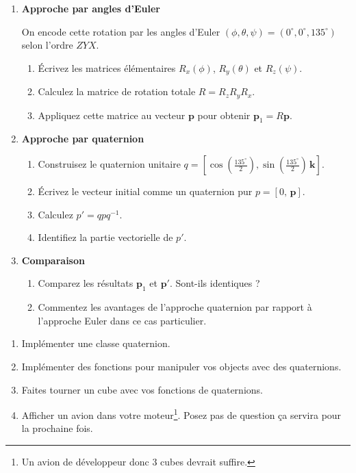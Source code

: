 \documentclass[a4paper,12pt]{article}
\begin{document}
\begin{enumerate}
	\item \textbf{Approche par angles d’Euler}

	      On encode cette rotation par les angles d’Euler $(\phi, \theta, \psi) = (0^\circ, 0^\circ, 135^\circ)$ selon l’ordre $ZYX$.
	      \begin{enumerate}
		      \item Écrivez les matrices élémentaires $R_x(\phi)$, $R_y(\theta)$ et $R_z(\psi)$.
		      \item Calculez la matrice de rotation totale $R = R_z R_y R_x$.
		      \item Appliquez cette matrice au vecteur $\mathbf{p}$ pour obtenir $\mathbf{p}_1 = R \mathbf{p}$.
	      \end{enumerate}

	\item \textbf{Approche par quaternion}
	      \begin{enumerate}
		      \item Construisez le quaternion unitaire $q = \left[\cos\left(\frac{135^\circ}{2}\right), \sin\left(\frac{135^\circ}{2}\right)\,\mathbf{k}\right]$.
		      \item Écrivez le vecteur initial comme un quaternion pur $p = [0,\,\mathbf{p}]$.
		      \item Calculez $p' = q p q^{-1}$.
		      \item Identifiez la partie vectorielle de $p'$.
	      \end{enumerate}

	\item \textbf{Comparaison}
	      \begin{enumerate}
		      \item Comparez les résultats $\mathbf{p}_1$ et $\mathbf{p}'$. Sont-ils identiques ?
		      \item Commentez les avantages de l’approche quaternion par rapport à l’approche Euler dans ce cas particulier.
	      \end{enumerate}
\end{enumerate}


\label{exo:impl}

\begin{enumerate}
	\item Implémenter une classe quaternion.
	\item Implémenter des fonctions pour manipuler vos objects avec des quaternions.
	\item Faites tourner un cube avec vos fonctions de quaternions.
	\item Afficher un avion dans votre moteur\footnote{Un avion de développeur donc 3 cubes devrait suffire.}. Posez pas de question ça servira pour la prochaine fois. 
\end{enumerate}
\end{document}
